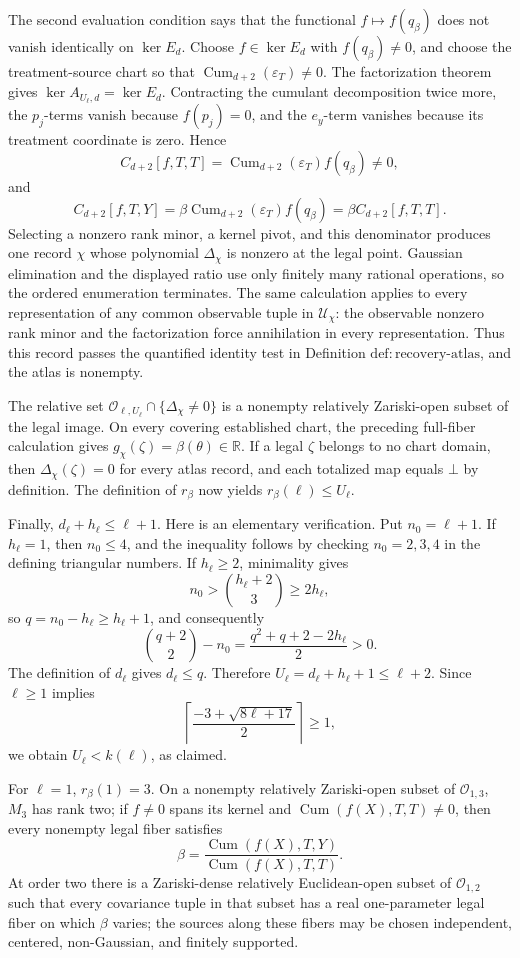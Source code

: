 The second evaluation condition says that the functional \(f\mapsto f(q_\beta)\) does not vanish identically on \(\ker E_d\).  Choose \(f\in\ker E_d\) with \(f(q_\beta)\ne0\), and choose the treatment-source chart so that \(\operatorname{Cum}_{d+2}(\varepsilon_T)\ne0\).  The factorization theorem gives \(\ker A_{U_\ell,d}=\ker E_d\).  Contracting the cumulant decomposition twice more, the \(p_j\)-terms vanish because \(f(p_j)=0\), and the \(e_y\)-term vanishes because its treatment coordinate is zero.  Hence
\[
 C_{d+2}[f,T,T]=\operatorname{Cum}_{d+2}(\varepsilon_T)f(q_\beta)\ne0,
\]
and
\[
 C_{d+2}[f,T,Y]
 =\beta\operatorname{Cum}_{d+2}(\varepsilon_T)f(q_\beta)
 =\beta C_{d+2}[f,T,T].
\]
Selecting a nonzero rank minor, a kernel pivot, and this denominator produces one record \(\chi\) whose polynomial \(\Delta_\chi\) is nonzero at the legal point.  Gaussian elimination and the displayed ratio use only finitely many rational operations, so the ordered enumeration terminates.  The same calculation applies to every representation of any common observable tuple in \(\mathcal U_\chi\): the observable nonzero rank minor and the factorization force annihilation in every representation.  Thus this record passes the quantified identity test in Definition \(\mathrm{def:recovery\mbox{-}atlas}\), and the atlas is nonempty.

The relative set \(\mathcal O_{\ell,U_\ell}\cap\{\Delta_\chi\ne0\}\) is a nonempty relatively Zariski-open subset of the legal image.  On every covering established chart, the preceding full-fiber calculation gives \(g_\chi(\zeta)=\beta(\theta)\in\mathbb R\).  If a legal \(\zeta\) belongs to no chart domain, then \(\Delta_\chi(\zeta)=0\) for every atlas record, and each totalized map equals \(\bot\) by definition.  The definition of \(r_\beta\) now yields \(r_\beta(\ell)\le U_\ell\).

Finally, \(d_\ell+h_\ell\le\ell+1\).  Here is an elementary verification.  Put \(n_0=\ell+1\).  If \(h_\ell=1\), then \(n_0\le4\), and the inequality follows by checking \(n_0=2,3,4\) in the defining triangular numbers.  If \(h_\ell\ge2\), minimality gives
\[
 n_0>\binom{h_\ell+2}{3}\ge2h_\ell,
\]
so \(q=n_0-h_\ell\ge h_\ell+1\), and consequently
\[
 \binom{q+2}{2}-n_0
 =\frac{q^2+q+2-2h_\ell}{2}>0.
\]
The definition of \(d_\ell\) gives \(d_\ell\le q\).  Therefore \(U_\ell=d_\ell+h_\ell+1\le\ell+2\).  Since \(\ell\ge1\) implies
\[
 \left\lceil\frac{-3+\sqrt{8\ell+17}}2\right\rceil\ge1,
\]
we obtain \(U_\ell<k(\ell)\), as claimed.

For \(\ell=1\), \(r_\beta(1)=3\).  On a nonempty relatively Zariski-open subset of \(\mathcal O_{1,3}\), \(M_3\) has rank two; if \(f\ne0\) spans its kernel and \(\operatorname{Cum}(f(X),T,T)\ne0\), then every nonempty legal fiber satisfies
\[
 \beta=\frac{\operatorname{Cum}(f(X),T,Y)}{\operatorname{Cum}(f(X),T,T)}.
\]
At order two there is a Zariski-dense relatively Euclidean-open subset of \(\mathcal O_{1,2}\) such that every covariance tuple in that subset has a real one-parameter legal fiber on which \(\beta\) varies; the sources along these fibers may be chosen independent, centered, non-Gaussian, and finitely supported.

